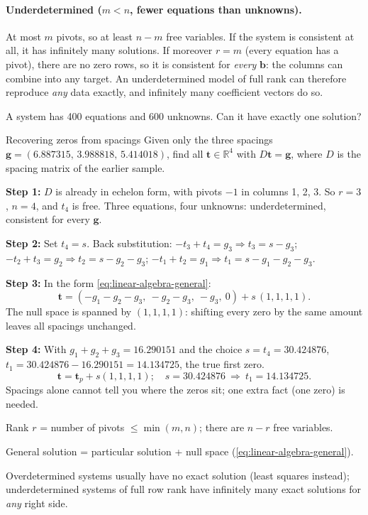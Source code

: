 \paragraph{Underdetermined ($m<n$, fewer equations than unknowns).} At most $m$ pivots, so at least $n-m$ free variables. If the system is consistent at all, it has infinitely many solutions. If moreover $r=m$ (every equation has a pivot), there are no zero rows, so it is consistent for \emph{every} $\bm b$: the columns can combine into any target. An underdetermined model of full rank can therefore reproduce \emph{any} data exactly, and infinitely many coefficient vectors do so.

\begin{checkpoint}
A system has 400 equations and 600 unknowns. Can it have exactly one solution?
\end{checkpoint}

\begin{sample}{Recovering zeros from spacings}
Given only the three spacings $\bm g=(6.887315,\,3.988818,\,5.414018)$, find all $\bm t\in\mathbb R^4$ with $D\bm t=\bm g$, where $D$ is the spacing matrix of the earlier sample.

\textbf{Step 1:} $D$ is already in echelon form, with pivots $-1$ in columns 1, 2, 3. So $r=3$, $n=4$, and $t_4$ is free. Three equations, four unknowns: underdetermined, consistent for every $\bm g$.

\textbf{Step 2:} Set $t_4=s$. Back substitution: $-t_3+t_4=g_3\Rightarrow t_3=s-g_3$; $-t_2+t_3=g_2\Rightarrow t_2=s-g_2-g_3$; $-t_1+t_2=g_1\Rightarrow t_1=s-g_1-g_2-g_3$.

\textbf{Step 3:} In the form \cref{eq:linear-algebra-general}:
\[
\bm t=(-g_1-g_2-g_3,\ -g_2-g_3,\ -g_3,\ 0)+s\,(1,1,1,1).
\]
The null space is spanned by $(1,1,1,1)$: shifting every zero by the same amount leaves all spacings unchanged.

\textbf{Step 4:} With $g_1+g_2+g_3=16.290151$ and the choice $s=t_4=30.424876$, $t_1=30.424876-16.290151=14.134725$, the true first zero.
\[
\boxed{\bm t=\bm t_p+s(1,1,1,1);\quad s=30.424876\ \Rightarrow\ t_1=14.134725.}
\]
Spacings alone cannot tell you where the zeros sit; one extra fact (one zero) is needed.
\end{sample}

\begin{keyideas}
\item Rank $r$ = number of pivots $\le\min(m,n)$; there are $n-r$ free variables.
\item General solution = particular solution + null space (\cref{eq:linear-algebra-general}).
\item Overdetermined systems usually have no exact solution (least squares instead); underdetermined systems of full row rank have infinitely many exact solutions for \emph{any} right side.
\end{keyideas}

